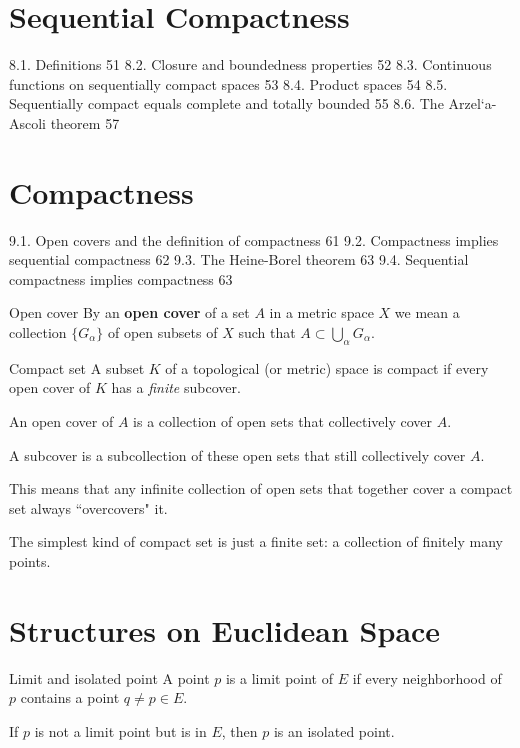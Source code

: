 \section{Sequential Compactness}
8.1. Definitions 51
8.2. Closure and boundedness properties 52
8.3. Continuous functions on sequentially compact spaces 53
8.4. Product spaces 54
8.5. Sequentially compact equals complete and totally bounded 55
8.6. The Arzel`a-Ascoli theorem 57

\section{Compactness}
9.1. Open covers and the definition of compactness 61
9.2. Compactness implies sequential compactness 62
9.3. The Heine-Borel theorem 63
9.4. Sequential compactness implies compactness 63

\begin{defn}{Open cover}{}
By an \textbf{open cover} of a set $A$ in a metric space $X$ we mean a collection $\{G_\alpha\}$ of open subsets of $X$ such that $A \subset \bigcup_\alpha G_\alpha$.
\end{defn}

\begin{defn}{Compact set}{}
A subset $K$ of a topological (or metric) space is compact if every open cover of $K$ has a \emph{finite} subcover.
\end{defn}

An open cover of $A$ is a collection of open sets that collectively cover $A$.

A subcover is a subcollection of these open sets that still collectively cover $A$.

This means that any infinite collection of open sets that together cover a compact set always ``overcovers" it.

The simplest kind of compact set is just a finite set: a collection of finitely many points.

\section{Structures on Euclidean Space}
\begin{defn}{Limit and isolated point}{}
A point $p$ is a limit point of $E$ if every neighborhood of $p$ contains a point $q \neq p \in E$. 

If $p$ is not a limit point but is in $E$, then $p$ is an isolated point.
\end{defn}

